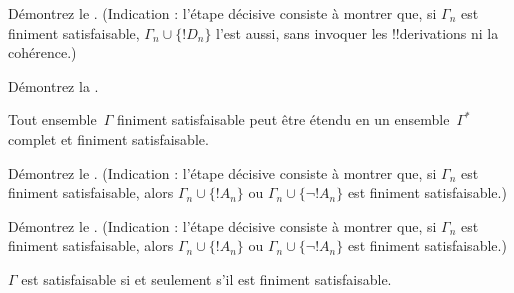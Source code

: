 \documentclass[../../../include/open-logic-section]{subfiles}
\begin{document}
\begin{prob}
Démontrez le . (Indication :
l'étape décisive consiste à montrer que, si $\Gamma_n$ est finiment
satisfaisable, $\Gamma_n\cup\{!D_n\}$ l'est aussi, sans invoquer les
!!{derivation}s ni la cohérence.)
\end{prob}
\tagendprob


\begin{prob}
Démontrez la .
\end{prob}
\tagendprob

\begin{lem}
Tout ensemble~$\Gamma$ finiment satisfaisable peut être étendu en un
ensemble~$\Gamma^*$ complet et finiment satisfaisable.
\end{lem}

\begin{prob}
Démontrez le . (Indication :
l'étape décisive consiste à montrer que, si $\Gamma_n$ est finiment
satisfaisable, alors $\Gamma_n\cup\{!A_n\}$ ou
$\Gamma_n\cup\{\lnot !A_n\}$ est finiment satisfaisable.)
\end{prob}
\tagendprob

\begin{prob}
Démontrez le . (Indication :
l'étape décisive consiste à montrer que, si $\Gamma_n$ est finiment
satisfaisable, alors $\Gamma_n\cup\{!A_n\}$ ou
$\Gamma_n\cup\{\lnot !A_n\}$ est finiment satisfaisable.)
\end{prob}
\tagendprob

\begin{thm}[Compacité]
$\Gamma$ est satisfaisable si et seulement s'il est finiment
satisfaisable.
\end{thm}
\end{document}
